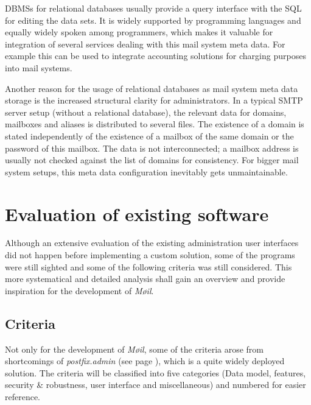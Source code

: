 \documentclass[12pt,a4paper]{scrartcl}
\begin{document}

		\acp{DBMS} for relational databases usually provide a query interface
		with the \ac{SQL} \cite{sql} for editing the data sets. It is widely
		supported by programming languages and equally widely spoken among
		programmers, which makes it valuable for integration of several
		services dealing with this mail system meta data. For example this can
		be used to integrate accounting solutions for charging purposes into
		mail systems.


		Another reason for the usage of relational databases as mail system
		meta data storage is the increased structural clarity for
		administrators. In a typical \acs{SMTP} \cite{smtp} server setup
		(without a relational database), the relevant data for domains,
		mailboxes and aliases is distributed to several files. The existence of
		a domain is stated independently of the existence of a mailbox of the
		same domain or the password of this mailbox. The data is not
		interconnected; a mailbox address is usually not checked against the
		list of domains for consistency. For bigger mail system setups, this
		meta data configuration inevitably gets unmaintainable.

	\section*{Evaluation of existing software}

		Although an extensive evaluation of the existing administration user
		interfaces did not happen before implementing a custom solution, some
		of the programs were still sighted and some of the following criteria
		was still considered. This more systematical and detailed analysis
		shall gain an overview and provide inspiration for the development of
		\emph{Møil}.

		\subsection*{Criteria}
			Not only for the development of \emph{Møil}, some of the criteria
			arose from shortcomings of \emph{postfix.admin} (see page
			\pageref{sec:contestants:postfix.admin}), which is a quite widely
			deployed solution. The criteria will be classified into five
			categories (Data model, features, security \& robustness, user
			interface and miscellaneous) and numbered for easier reference.
\end{document}
